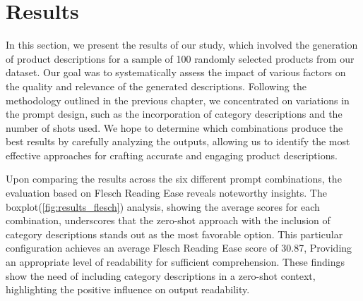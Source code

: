 \chapter{Results}\label{chap:results}



In this section, we present the results of our study, which involved the generation of product descriptions for a sample of 100 randomly selected products from our dataset. Our goal was to systematically assess the impact of various factors on the quality and relevance of the generated descriptions. Following the methodology outlined in the previous chapter, we concentrated on variations in the prompt design, such as the incorporation of category descriptions and the number of shots used. We hope to determine which combinations produce the best results by carefully analyzing the outputs, allowing us to identify the most effective approaches for crafting accurate and engaging product descriptions.


Upon comparing the results across the six different prompt combinations, the evaluation based on Flesch Reading Ease reveals noteworthy insights. The boxplot(\autoref{fig:results_flesch}) analysis, showing the average scores for each combination, underscores that the zero-shot approach with the inclusion of category descriptions stands out as the most favorable option. This particular configuration achieves an average Flesch Reading Ease score of 30.87, Providing an appropriate level of readability for sufficient comprehension. These findings show the need of including category descriptions in a zero-shot context, highlighting the positive influence on output readability.


